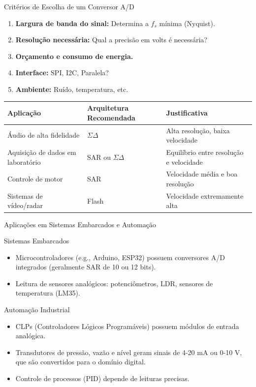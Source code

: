 \documentclass{beamer}
\begin{document}
\begin{frame}{Critérios de Escolha de um Conversor A/D}
    \begin{enumerate}
        \item \textbf{Largura de banda do sinal:} Determina a $f_s$ mínima (Nyquist).
        \item \textbf{Resolução necessária:} Qual a precisão em volts é necessária?
        \item \textbf{Orçamento e consumo de energia.}
        \item \textbf{Interface:} SPI, I2C, Paralela?
        \item \textbf{Ambiente:} Ruído, temperatura, etc.
    \end{enumerate}
    \vspace{0.3cm}
    \begin{table}
        \centering
        \begin{tabular}{p{2.5cm}|p{3.5cm}|p{2.5cm}}
            \toprule
            \textbf{Aplicação} & \textbf{Arquitetura Recomendada} & \textbf{Justificativa} \\
            \midrule
            Áudio de alta fidelidade & $\Sigma\Delta$ & Alta resolução, baixa velocidade \\
            Aquisição de dados em laboratório & SAR ou $\Sigma\Delta$ & Equilíbrio entre resolução e velocidade \\
            Controle de motor & SAR & Velocidade média e boa resolução \\
            Sistemas de vídeo/radar & Flash & Velocidade extremamente alta \\
            \bottomrule
        \end{tabular}
    \end{table}
\end{frame}

\begin{frame}{Aplicações em Sistemas Embarcados e Automação}
    \begin{block}{Sistemas Embarcados}
        \begin{itemize}
            \item Microcontroladores (e.g., Arduino, ESP32) possuem conversores A/D integrados (geralmente SAR de 10 ou 12 bits).
            \item Leitura de sensores analógicos: potenciômetros, LDR, sensores de temperatura (LM35).
        \end{itemize}
    \end{block}
    \begin{block}{Automação Industrial}
        \begin{itemize}
            \item CLPs (Controladores Lógicos Programáveis) possuem módulos de entrada analógica.
            \item Transdutores de pressão, vazão e nível geram sinais de 4-20 mA ou 0-10 V, que são convertidos para o domínio digital.
            \item Controle de processos (PID) depende de leituras precisas.
        \end{itemize}
    \end{block}
\end{frame}
\end{document}
